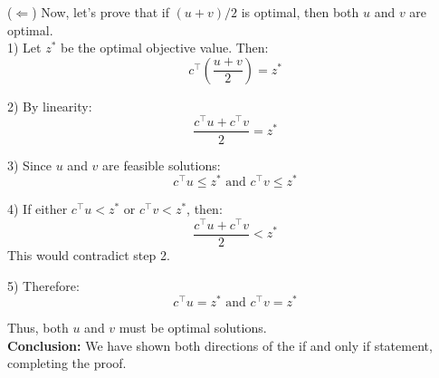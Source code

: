 \documentclass{article}
\begin{document}
($\Leftarrow$) Now, let's prove that if $(u + v)/2$ is optimal, then both $u$ and $v$ are optimal. \\

1) Let $z^*$ be the optimal objective value. Then:
   \[ c^\top(\frac{u + v}{2}) = z^* \]

2) By linearity:
   \[ \frac{c^\top u + c^\top v}{2} = z^* \]

3) Since $u$ and $v$ are feasible solutions:
   \[ c^\top u \leq z^* \text{ and } c^\top v \leq z^* \]

4) If either $c^\top u < z^*$ or $c^\top v < z^*$, then:
   \[ \frac{c^\top u + c^\top v}{2} < z^* \]
   This would contradict step 2.

5) Therefore:
   \[ c^\top u = z^* \text{ and } c^\top v = z^* \]

Thus, both $u$ and $v$ must be optimal solutions. \\

\textbf{Conclusion:} We have shown both directions of the if and only if statement, completing the proof.
\end{document}
